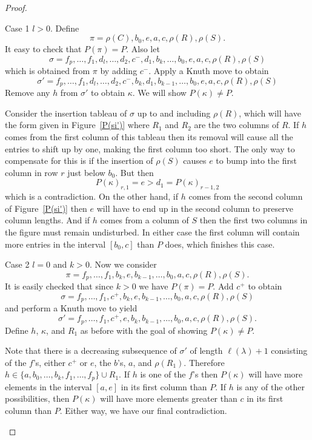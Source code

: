 \documentclass[10pt]{amsart}
\newenvironment{enonce*}[2][]{\par\smallskip\noindent\textit{#2.}\ }{\par\smallskip}
\newcommand{\ka}{\kappa}
\newcommand{\la}{\lambda}
\newcommand{\si}{\sigma}
\begin{document}
\begin{proof}
\begin{enonce*}[remark]{Case 1} $l > 0$.
Define
\[
\pi = \rho(C), b_0, e, a, c, \rho(R), \rho(S).
\]
It easy to check that $P(\pi) = P$.
Also let
\[
\si= f_p,\dots,f_1,d_l,\dots,d_2,c^-,d_1,b_k,\dots,b_0, e, a, c, \rho(R), \rho(S)
\]
which is obtained from $\pi$ by adding $c^-$. Apply a Knuth move to obtain
\[
\si'= f_p,\dots,f_1,d_l,\dots,d_2,c^-,b_k,d_1,b_{k-1},\dots,b_0, e, a, c, \rho(R), \rho(S)
\]
Remove any $h$ from $\si'$ to obtain $\ka$. We will show $P(\ka)\neq P$.

Consider the insertion tableau of $\si$ up to and including $\rho(R)$, which will have the form given in Figure~\ref{P(si')} where $R_1$ and $R_2$ are the two columns of $R$. If $h$ comes from the first column of this tableau then its removal will cause all the entries to shift up by one, making the first column too short. The only way to compensate for this is if the insertion of $\rho(S)$ causes $e$ to bump into the first column in row $r$ just below $b_0$. But then 
\[
P(\ka)_{r,1}=e>d_1=P(\ka)_{r-1,2}
\]
which is a contradiction. On the other hand, if $h$ comes from the second column of Figure~\ref{P(si')} then $e$ will have to end up in the second column to preserve column lengths. And if $h$ comes from a column of $S$ then the first two columns in the figure must remain undisturbed. In either case the first column will contain more entries in the interval $[b_0,c]$ than $P$ does, which finishes this case.
\end{enonce*}

\begin{enonce*}[remark]{Case 2} 
$l=0$ and $k>0$.
Now we consider
\[
\pi= f_p,\dots,f_1,b_k,e,b_{k-1},\dots,b_0, a, c, \rho(R), \rho(S).
\]
It is easily checked that since $k>0$ we have $P(\pi)=P$. Add $c^+$ to obtain
\[
\si= f_p,\dots,f_1,c^+,b_k,e,b_{k-1},\dots,b_0, a, c, \rho(R), \rho(S)
\]
and perform a Knuth move to yield
\[
\si'=f_p,\dots,f_1,c^+,e,b_k,b_{k-1},\dots,b_0, a, c, \rho(R), \rho(S).
\]
Define $h$, $\ka$, and $R_1$ as before with the goal of showing $P(\ka)\neq P$.



Note that there is a decreasing subsequence of $\si'$ of length $\ell(\la)+1$ consisting of the $f$'s, either $c^+$ or $e$, the $b$'s, $a$, and $\rho(R_1)$.
Therefore $h\in\{a,b_0,\dots,b_k,f_1,\dots,f_p\}\cup R_1$. If $h$ is one of the $f$'s then $P(\ka)$ will have more elements in the interval $[a,e]$ in its first column than $P$. If $h$ is any of the other possibilities, then $P(\ka)$ will have more elements greater than $c$ in its first column than $P$. Either way, we have our final contradiction.\qedhere
\end{enonce*}
\end{proof}
\end{document}
